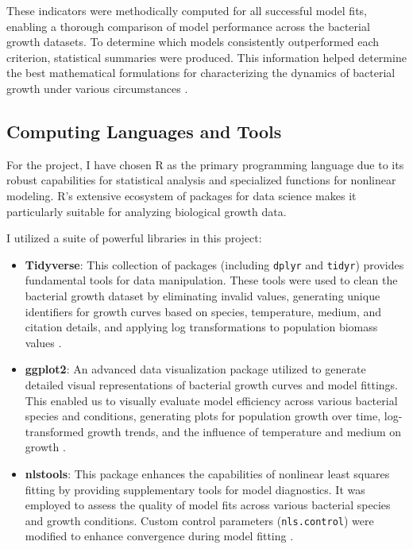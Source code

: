 \documentclass[11pt]{article}
\begin{document}
These indicators were methodically computed for all successful model fits, enabling a thorough comparison of model performance across the bacterial growth datasets. To determine which models consistently outperformed each criterion, statistical summaries were produced. This information helped determine the best mathematical formulations for characterizing the dynamics of bacterial growth under various circumstances \citep{Li2010}.

\subsection{Computing Languages and Tools}
For the project, I have chosen R as the primary programming language due to its robust capabilities for statistical analysis and specialized functions for nonlinear modeling. R's extensive ecosystem of packages for data science makes it particularly suitable for analyzing biological growth data.

I utilized a suite of powerful libraries in this project:
\begin{itemize}
    \item \textbf{Tidyverse}: This collection of packages (including \texttt{dplyr} and \texttt{tidyr}) provides fundamental tools for data manipulation. These tools were used to clean the bacterial growth dataset by eliminating invalid values, generating unique identifiers for growth curves based on species, temperature, medium, and citation details, and applying log transformations to population biomass values \citep{Pankowski2016}.
    \item \textbf{ggplot2}: An advanced data visualization package utilized to generate detailed visual representations of bacterial growth curves and model fittings. This enabled us to visually evaluate model efficiency across various bacterial species and conditions, generating plots for population growth over time, log-transformed growth trends, and the influence of temperature and medium on growth \citep{Tahon2018}.
    \item \textbf{nlstools}: This package enhances the capabilities of nonlinear least squares fitting by providing supplementary tools for model diagnostics. It was employed to assess the quality of model fits across various bacterial species and growth conditions. Custom control parameters (\texttt{nls.control}) were modified to enhance convergence during model fitting \citep{Wadsworth2017}.
\end{itemize}
\end{document}
